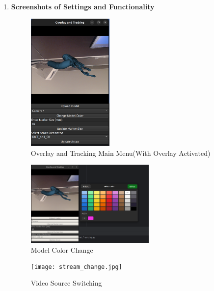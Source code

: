 \documentclass[12pt]{article}
\begin{document}
\begin{enumerate}
\begin{enumerate}
                  \item \textbf{Screenshots of Settings and Functionality}
                        \begin{figure}[H]
                              \centering
                              \includegraphics[width=0.4\textwidth]{overlay.png}
                              \caption{Overlay and Tracking Main Menu(With Overlay Activated)}
                        \end{figure}
                        \begin{figure}[H]
                              \centering
                              \includegraphics[width=0.6\textwidth]{coulor.png}
                              \caption{Model Color Change}
                        \end{figure}
                        \begin{figure}[H]
                              \centering
                              \texttt{[image: stream\_change.jpg]}
                              \caption{Video Source Switching}
                        \end{figure}

\end{enumerate}
\end{enumerate}
\end{document}
